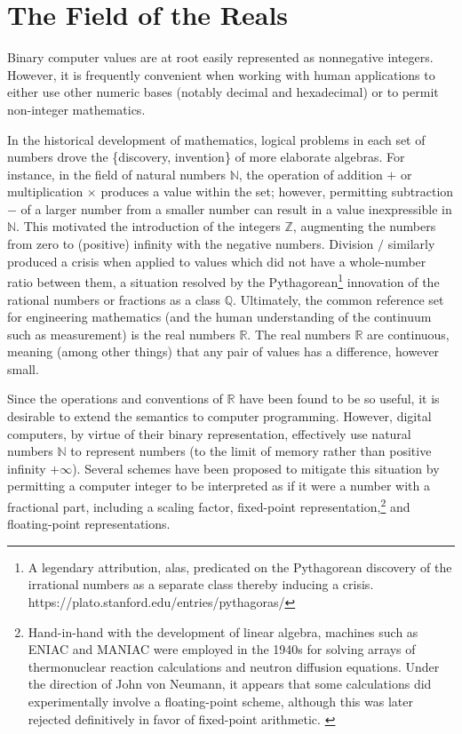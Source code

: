 \documentclass[twoside]{article}
\begin{document}
\section{The Field of the Reals}

Binary computer values are at root easily represented as nonnegative integers.  However, it is frequently convenient when working with human applications to either use other numeric bases (notably decimal and hexadecimal) or to permit non-integer mathematics.

In the historical development of mathematics, logical problems in each set of numbers drove the \{discovery, invention\} of more elaborate algebras.  For instance, in the field of natural numbers $\mathbb{N}$, the operation of addition $+$ or multiplication $\times$ produces a value within the set; however, permitting subtraction $-$ of a larger number from a smaller number can result in a value inexpressible in $\mathbb{N}$.  This motivated the introduction of the integers $\mathbb{Z}$, augmenting the numbers from zero to (positive) infinity with the negative numbers.  Division $/$ similarly produced a crisis when applied to values which did not have a whole-number ratio between them, a situation resolved by the Pythagorean\footnote{A legendary attribution, alas, predicated on the Pythagorean discovery of the irrational numbers as a separate class thereby inducing a crisis.  https://plato.stanford.edu/entries/pythagoras/} innovation of the rational numbers or fractions as a class $\mathbb{Q}$.  Ultimately, the common reference set for engineering mathematics (and the human understanding of the continuum such as measurement) is the real numbers $\mathbb{R}$.  The real numbers $\mathbb{R}$ are continuous, meaning (among other things) that any pair of values has a difference, however small.  

Since the operations and conventions of $\mathbb{R}$ have been found to be so useful, it is desirable to extend the semantics to computer programming.  However, digital computers, by virtue of their binary representation, effectively use natural numbers $\mathbb{N}$ to represent numbers (to the limit of memory rather than positive infinity $+\infty$).  Several schemes have been proposed to mitigate this situation by permitting a computer integer to be interpreted as if it were a number with a fractional part, including a scaling factor, fixed-point representation,\footnote{Hand-in-hand with the development of linear algebra, machines such as ENIAC and MANIAC were employed in the 1940s for solving arrays of thermonuclear reaction calculations and neutron diffusion equations.  Under the direction of John von Neumann, it appears that some calculations did experimentally involve a floating-point scheme, although this was later rejected definitively in favor of fixed-point arithmetic.  \citep[p.~3]{Kahan1997a}} and floating-point representations.
\end{document}
